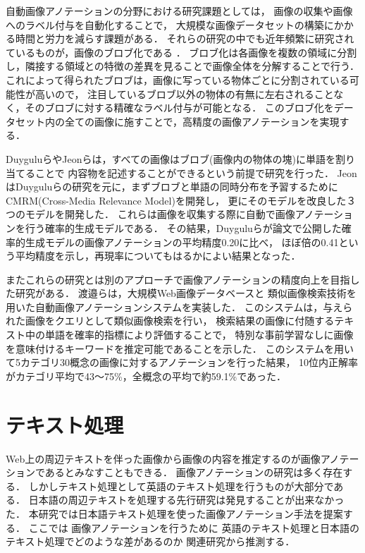 自動画像アノテーションの分野における研究課題としては，
画像の収集や画像へのラベル付与を自動化することで，
大規模な画像データセットの構築にかかる時間と労力を減らす課題がある．
%
それらの研究の中でも近年頻繁に研究されているものが，画像のブロブ化である
\cite{duygulu,jeon}
．
ブロブ化は各画像を複数の領域に分割し，隣接する領域との特徴の差異を見ることで画像全体を分解することで行う．
これによって得られたブロブは，画像に写っている物体ごとに分割されている可能性が高いので，
注目しているブロブ以外の物体の有無に左右されることなく，そのブロブに対する精確なラベル付与が可能となる．
このブロブ化をデータセット内の全ての画像に施すことで，高精度の画像アノテーションを実現する．

Duygulu\cite{duygulu}らやJeon\cite{jeon}らは，すべての画像はブロブ(画像内の物体の塊)に単語を割り当てることで
内容物を記述することができるという前提で研究を行った．
JeonはDuyguluらの研究を元に，まずブロブと単語の同時分布を予習するためにCMRM(Cross-Media Relevance Model)を開発し，
更にそのモデルを改良した３つのモデルを開発した．
これらは画像を収集する際に自動で画像アノテーションを行う確率的生成モデルである．
その結果，Duyguluらが論文で公開した確率的生成モデルの画像アノテーションの平均精度0.20に比べ，
ほぼ倍の0.41という平均精度を示し，再現率についてもはるかによい結果となった．

またこれらの研究とは別のアプローチで画像アノテーションの精度向上を目指した研究がある．
渡邉ら\cite{watanabe}は，大規模Web画像データベースと
類似画像検索技術を用いた自動画像アノテーションシステムを実装した．
このシステムは，与えられた画像をクエリとして類似画像検索を行い，
検索結果の画像に付随するテキスト中の単語を確率的指標により評価することで，
特別な事前学習なしに画像を意味付けるキーワードを推定可能であることを示した．
このシステムを用いて5カテゴリ30概念の画像に対するアノテーションを行った結果，
10位内正解率がカテゴリ平均で43～75\%，全概念の平均で約59.1\%であった．

\section{テキスト処理}

Web上の周辺テキストを伴った画像から画像の内容を推定するのが画像アノテーションであるとみなすこともできる．
画像アノテーションの研究は多く存在する．
しかしテキスト処理として英語のテキスト処理を行うものが大部分である．
日本語の周辺テキストを処理する先行研究は発見することが出来なかった．
本研究では日本語テキスト処理を使った画像アノテーション手法を提案する．
%
ここでは
画像アノテーションを行うために
英語のテキスト処理と日本語のテキスト処理でどのような差があるのか
関連研究から推測する．

